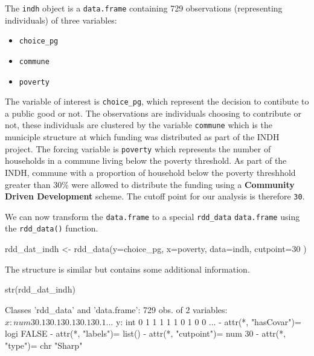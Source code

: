 \documentclass[article]{jss}
\begin{document}
The \texttt{indh} object is a \texttt{data.frame} containing 729
observations (representing individuals) of three variables:

\begin{itemize}
\itemsep1pt\parskip0pt
\item
  \texttt{choice\_pg}
\item
  \texttt{commune}
\item
  \texttt{poverty}
\end{itemize}

The variable of interest is \texttt{choice\_pg}, which represent the
decision to contibute to a public good or not. The observations are
individuals choosing to contribute or not, these individuals are
clustered by the variable \texttt{commune} which is the municiple
structure at which funding was distributed as part of the INDH project.
The forcing variable is \texttt{poverty} which represents the number of
households in a commune living below the poverty threshold. As part of
the INDH, commune with a proportion of household below the poverty
threshhold greater than 30\% were allowed to distribute the funding
using a \textbf{Community Driven Development} scheme. The cutoff point
for our analysis is therefore \texttt{30}.

We can now transform the \texttt{data.frame} to a special
\texttt{rdd\_data} \texttt{data.frame} using the \texttt{rdd\_data()}
function.

\begin{CodeChunk}
\begin{CodeInput}
rdd_dat_indh <- rdd_data(y=choice_pg,
                         x=poverty,
                         data=indh,
                         cutpoint=30 )
\end{CodeInput}
\end{CodeChunk}

The structure is similar but contains some additional information.

\begin{CodeChunk}
\begin{CodeInput}
str(rdd_dat_indh)
\end{CodeInput}
\begin{CodeOutput}
Classes 'rdd_data' and 'data.frame':    729 obs. of  2 variables:
 $ x: num  30.1 30.1 30.1 30.1 30.1 ...
 $ y: int  0 1 1 1 1 1 0 1 0 0 ...
 - attr(*, "hasCovar")= logi FALSE
 - attr(*, "labels")= list()
 - attr(*, "cutpoint")= num 30
 - attr(*, "type")= chr "Sharp"
\end{CodeOutput}
\end{CodeChunk}
\end{document}
